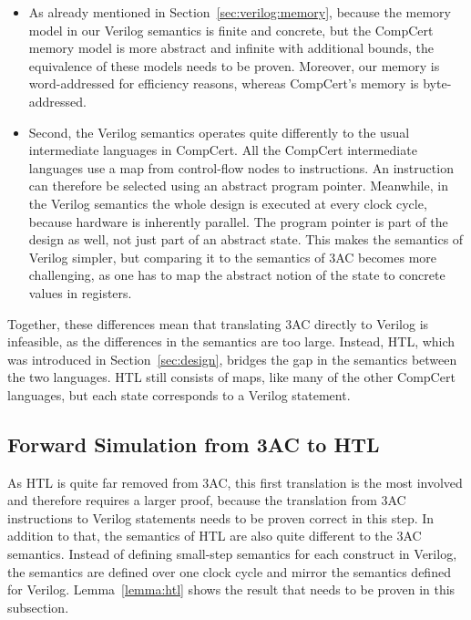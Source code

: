 \begin{itemize}
\item As already mentioned in Section~\ref{sec:verilog:memory}, because the
  memory model in our Verilog semantics is finite and concrete, but the CompCert
  memory model is more abstract and infinite with additional bounds, the
  equivalence of these models needs to be proven.  Moreover, our memory is
  word-addressed for efficiency reasons, whereas CompCert's memory is
  byte-addressed.

\item Second, the Verilog semantics operates quite differently to the usual
  intermediate languages in CompCert.  All the CompCert intermediate languages
  use a map from control-flow nodes to instructions.  An instruction can
  therefore be selected using an abstract program pointer. Meanwhile, in the
  Verilog semantics the whole design is executed at every clock cycle, because
  hardware is inherently parallel. The program pointer is part of the design as
  well, not just part of an abstract state. This makes the semantics of Verilog
  simpler, but comparing it to the semantics of 3AC becomes more challenging, as
  one has to map the abstract notion of the state to concrete values in
  registers.
\end{itemize}

Together, these differences mean that translating 3AC directly to Verilog is
infeasible, as the differences in the semantics are too large.  Instead, HTL,
which was introduced in Section~\ref{sec:design}, bridges the gap in the
semantics between the two languages.  HTL still consists of maps, like many of
the other CompCert languages, but each state corresponds to a Verilog statement.

\subsection{Forward Simulation from 3AC to HTL}\label{sec:proof:3ac_htl}

As HTL is quite far removed from 3AC, this first translation is the most
involved and therefore requires a larger proof, because the translation from 3AC
instructions to Verilog statements needs to be proven correct in this step.  In
addition to that, the semantics of HTL are also quite different to the 3AC
semantics. Instead of defining small-step semantics for each construct in
Verilog, the semantics are defined over one clock cycle and mirror the semantics
defined for Verilog.  Lemma~\ref{lemma:htl} shows the result that needs to be
proven in this subsection.

